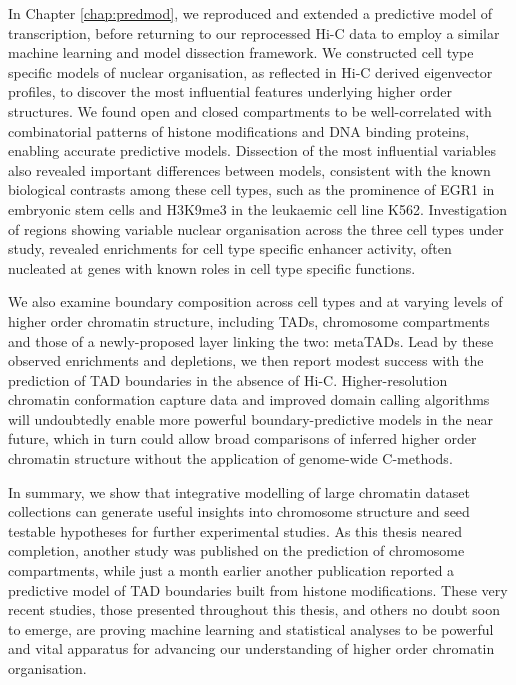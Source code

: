 \documentclass[a4paper,11pt,oneside]{book}
\begin{document}
In Chapter \ref{chap:predmod}, we reproduced and extended a predictive model of transcription, before returning to our reprocessed Hi-C data to employ a similar machine learning and model dissection framework.
We constructed cell type specific models of nuclear
organisation, as reflected in Hi-C derived eigenvector profiles, to
discover the most influential features underlying higher order
structures. We found open and closed compartments to be
well-correlated with combinatorial patterns of histone modifications
and DNA binding proteins, enabling accurate predictive models. Dissection of the
most influential variables also revealed important differences between
models, consistent with the known biological contrasts among these
cell types, such as the prominence of EGR1 in embryonic stem cells and
H3K9me3 in the leukaemic cell line K562. Investigation of regions showing
variable nuclear organisation across the three cell types under study,
revealed enrichments for cell type specific enhancer activity, often
nucleated at genes with known roles in cell type specific
functions.

We also examine boundary composition across cell types and at varying levels of higher order chromatin structure, including TADs, chromosome compartments and those of a newly-proposed layer linking the two: metaTADs. Lead by these observed enrichments and depletions, we then report modest success with the prediction of TAD boundaries in the absence of Hi-C. Higher-resolution chromatin conformation capture data and improved domain calling algorithms will undoubtedly enable more powerful boundary-predictive models in the near future, which in turn could allow broad comparisons of inferred higher order chromatin structure without the application of genome-wide C-methods.

In summary, we show that integrative modelling of large chromatin dataset
collections can generate useful insights into chromosome structure and seed testable hypotheses for further
experimental studies. As this thesis neared completion, another study was published on the prediction of chromosome compartments,\cite{Fortin2015a} while just a month earlier another publication reported a predictive model of TAD boundaries built from histone modifications.\cite{Huang2015} These very recent studies, those presented throughout this thesis, and others no doubt soon to emerge, are proving machine learning and statistical analyses to be powerful and vital apparatus for advancing our understanding of higher order chromatin organisation.

\ifstandalone
\begin{small}

\end{small}
\fi
\end{document}
